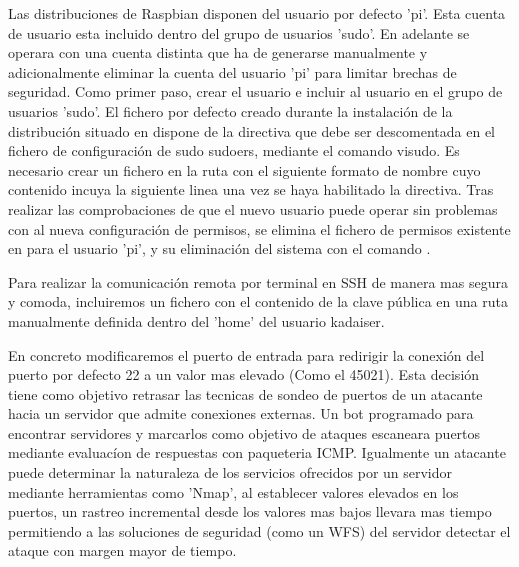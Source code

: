 Las distribuciones de Raspbian disponen del usuario por defecto 'pi'. Esta cuenta de usuario esta incluido dentro del grupo de usuarios 'sudo'. En adelante se operara con una cuenta distinta que ha de generarse manualmente y adicionalmente eliminar la cuenta del usuario 'pi' para limitar brechas de seguridad. Como primer paso, crear el usuario  e incluir al usuario en el grupo de usuarios 'sudo'. El fichero por defecto creado durante la instalación de la distribución situado en  dispone de la directiva  que debe ser descomentada en el fichero de configuración de sudo sudoers, mediante el comando visudo. Es necesario crear un fichero en la ruta  con el siguiente formato de nombre  cuyo contenido incuya la siguiente linea  una vez se haya habilitado la directiva. Tras realizar las comprobaciones de que el nuevo usuario puede operar sin problemas con al nueva configuración de permisos, se elimina el fichero de permisos existente en  para el usuario 'pi', y su eliminación del sistema con el comando .

Para realizar la comunicación remota por terminal en SSH de manera mas segura y comoda, incluiremos un fichero con el contenido de la clave pública en una ruta manualmente definida dentro del 'home' del usuario kadaiser.

En concreto modificaremos el puerto de entrada para redirigir la conexión del puerto por defecto 22 a un valor mas elevado (Como el 45021). Esta decisión tiene como objetivo retrasar las tecnicas de sondeo de puertos de un atacante hacia un servidor que admite conexiones externas. Un bot programado para encontrar servidores y marcarlos como objetivo de ataques escaneara puertos mediante evaluacíon de respuestas con paqueteria ICMP. Igualmente un atacante puede determinar la naturaleza de los servicios ofrecidos por un servidor mediante herramientas como 'Nmap', al establecer valores elevados en los puertos, un rastreo incremental desde los valores mas bajos llevara mas tiempo permitiendo a las soluciones de seguridad (como un WFS) del servidor detectar el ataque con margen mayor de tiempo.

